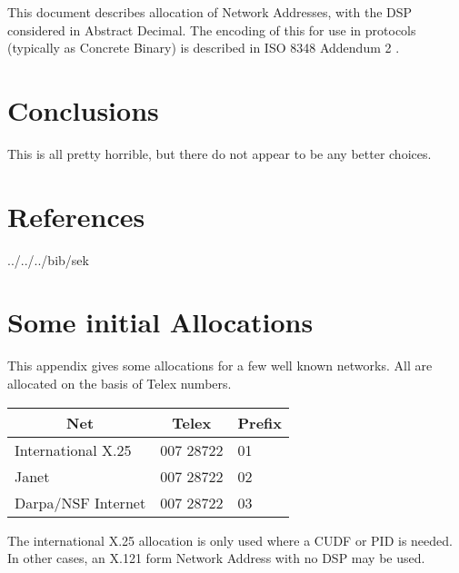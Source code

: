 This document describes allocation of Network Addresses, with the DSP
considered in Abstract Decimal.  The encoding of this for use in protocols
(typically as Concrete Binary) is
described in 
ISO 8348 Addendum 2
\cite{ISO.Network.Naming}.

\section {Conclusions}

This is all pretty horrible, but there do not appear to be any
better choices.

\section {References}

 {../../../bib/sek}
\pagebreak
\appendix 
\section {Some initial Allocations}

This appendix gives some allocations for a few well known networks.
All are allocated on the basis of Telex numbers.  

\begin {center}
\begin {tabular}{|l|	ll|}
\hline
\multicolumn{1}{|c}{Net} &
\multicolumn{1}{c}{Telex} &
\multicolumn{1}{c|}{Prefix} \\
\hline
International X.25  & 007 28722 & 01 \\
Janet & 007 28722 & 02 \\
Darpa/NSF Internet  & 007 28722 & 03 \\
\hline
\end {tabular}
\end {center}

The international X.25 allocation is only used where a CUDF or PID is needed.
In other cases, an X.121 form Network Address with no DSP may be used.



